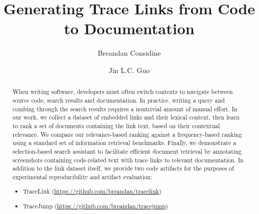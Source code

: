 \documentclass[sigconf,authordraft]{acmart}
\begin{document}
\title{Generating Trace Links from Code to Documentation}

\author{Breandan Considine}

\author{Jin L.C. Guo}


\begin{abstract}
When writing software, developers must often switch contexts to navigate between source code, search results and documentation. In practice, writing a query and combing through the search results requires a nontrivial amount of manual effort. In our work, we collect a dataset of embedded links and their lexical context, then learn to rank a set of documents containing the link text, based on their contextual relevance. We compare our relevance-based ranking against a frequency-based ranking using a standard set of information retrieval benchmarks. Finally, we demonstrate a selection-based search assistant to facilitate efficient document retrieval by annotating screenshots containing code-related text with trace links to relevant documentation. In addition to the link dataset itself, we provide two code artifacts for the purposes of experimental reproducibility and artifact evaluation:

\begin{itemize}
    \item TraceLink (\href{https://github.com/breandan/tracelink}{https://github.com/breandan/tracelink})
    \item TraceJump (\href{https://github.com/breandan/tracejump}{https://github.com/breandan/tracejump})
\end{itemize}
\end{abstract}
\end{document}
